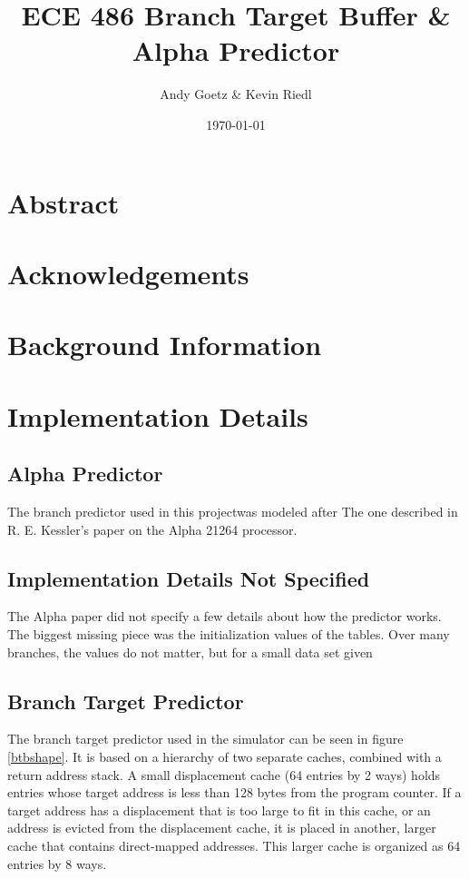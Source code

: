 \documentclass[twocolumn]{article}
\author{\LARGE Andy Goetz \& Kevin Riedl}
\date{\today}
\title{\Huge \textbf{ECE 486 Branch Target Buffer \& Alpha Predictor}}
\begin{document}
\maketitle

\section{Abstract}
\section{Acknowledgements}
\section{Background Information}

\section{Implementation Details}
\subsection{Alpha Predictor}
The branch predictor used in this projectwas modeled after
The one described in R. E. Kessler's paper on the Alpha 
21264 processor.
\subsection{Implementation Details Not Specified}
The Alpha paper did not specify a few details about how the predictor
works. The biggest missing piece was the initialization values of the tables.
Over many branches, the values do not matter, but for a small data set given



\subsection{Branch Target Predictor} 

The branch target predictor used in the simulator can be seen in
figure \ref{btbshape}. It is based on a hierarchy of two separate
caches, combined with a return address stack. A small displacement
cache (64 entries by 2 ways) holds entries whose target address is
less than 128 bytes from the program counter. If a target address has
a displacement that is too large to fit in this cache, or an address
is evicted from the displacement cache, it is placed in another,
larger cache that contains direct-mapped addresses. This larger cache
is organized as 64 entries by 8 ways.
\end{document}

